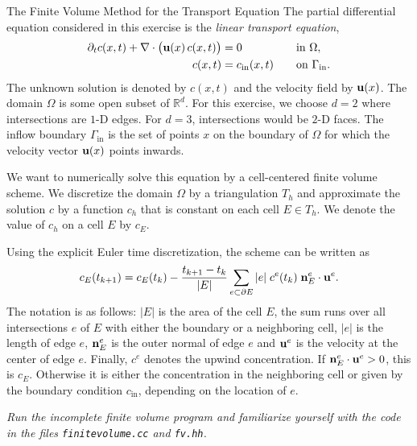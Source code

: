 \documentclass[12pt,a4paper]{article}
\newcommand{\uu}{\textbf u}
\newcommand{\nn}{\textbf n}
\begin{document}
\begin{Exercise}{The Finite Volume Method for the Transport Equation}
The partial differential equation considered in this exercise is the
\emph{linear transport equation},
\begin{equation}
  \label{eq:trans}
  \begin{split}
    \partial_t c(x, t) + \nabla\cdot\big(\uu(x)\,c(x,t)\big) &= 0 \\
    c(x,t) &= c_\text{in}(x,t)
  \end{split}
  \qquad
  \begin{split}
    &\text{in }\Omega, \\
    &\text{on }\Gamma_\text{in}.
  \end{split}
\end{equation}
The unknown solution is denoted by $c(x,t)$ and the velocity field by
$\uu(x)$.  The domain $\Omega$ is some open subset of $\mathbb{R}^d$.
For this exercise, we choose $d=2$ where intersections are $1$-D edges.
For $d=3$, intersections would be $2$-D faces.
The inflow boundary $\Gamma_\text{in}$ is the set of points $x$ on the
boundary of $\Omega$ for which the velocity vector $\uu(x)$ points
inwards.

We want to numerically solve this equation by a cell-centered
finite volume scheme.  We discretize the domain $\Omega$ by a
triangulation $T_h$ and approximate the solution $c$ by a function
$c_h$ that is constant on each cell $E\in T_h$.  We denote the value
of $c_h$ on a cell $E$ by $c_E$.

Using the explicit Euler time discretization, the scheme can be
written as
\begin{equation}
  c_E(t_{k+1}) = c_E(t_k) - \frac{t_{k+1}-t_k}{|E|}
  \sum_{e\subset\partial E}|e|\;c^e(t_k)\;\nn_E^e\cdot\uu^e.
\end{equation}
The notation is as follows: $|E|$ is the area of the cell $E$, the
sum runs over all intersections $e$ of $E$ with either the boundary or
a neighboring cell, $|e|$ is the length of edge $e$, $\nn_E^e$ is the
outer normal of edge $e$ and $\uu^e$ is the velocity at the center of
edge $e$.  Finally, $c^e$ denotes the upwind concentration.  If
$\nn_E^e\cdot\uu^e>0$, this is $c_E$.  Otherwise it is either the
concentration in the neighboring cell or given by the boundary
condition $c_\text{in}$, depending on the location of $e$.

 \emph{Run the incomplete finite volume program and familiarize yourself with
  the code in the files \texttt{finitevolume.cc} and \texttt{fv.hh}.}


\end{Exercise}
\end{document}
